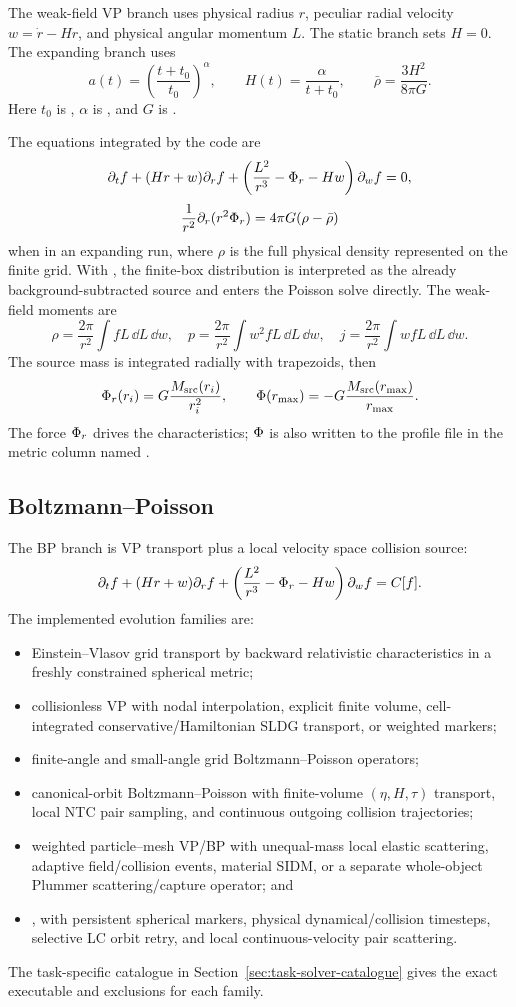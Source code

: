 The weak-field VP branch uses physical radius \(r\), peculiar radial velocity
\(w=\dot r-Hr\), and physical angular momentum \(L\).  The static branch sets
\(H=0\).  The expanding branch uses
\[
  a(t)=\left(\frac{t+t_0}{t_0}\right)^\alpha,\qquad
  H(t)=\frac{\alpha}{t+t_0},\qquad
  \bar\rho=\frac{3H^2}{8\pi G}.
\]
Here \(t_0\) is , \(\alpha\) is , and
\(G\) is .

The equations integrated by the code are
\[
  \partial_t f +(Hr+w)\partial_r f
  +\left(\frac{L^2}{r^3}-\Phi_r-Hw\right)\partial_w f=0,
\]
\[
  \frac{1}{r^2}\partial_r(r^2\Phi_r)
  =4\pi G(\rho-\bar\rho)
\]
when  in an expanding run, where
\(\rho\) is the full physical density represented on the finite grid.  With
, the finite-box distribution is interpreted as the
already background-subtracted source and enters the Poisson solve directly.
The weak-field moments are
\[
  \rho=\frac{2\pi}{r^2}\int fL\,\dd L\,\dd w,\quad
  p=\frac{2\pi}{r^2}\int w^2fL\,\dd L\,\dd w,\quad
  j=\frac{2\pi}{r^2}\int wfL\,\dd L\,\dd w .
\]
The source mass is integrated radially with trapezoids, then
\[
  \Phi_r(r_i)=G\frac{M_{\rm src}(r_i)}{r_i^2},
  \qquad
  \Phi(r_{\max})=-G\frac{M_{\rm src}(r_{\max})}{r_{\max}}.
\]
The force \(\Phi_r\) drives the characteristics; \(\Phi\) is also written to the
profile file in the metric column named .

\subsection{Boltzmann--Poisson}

The BP branch is VP transport plus a local velocity space collision source:
\[
  \partial_t f +(Hr+w)\partial_r f
  +\left(\frac{L^2}{r^3}-\Phi_r-Hw\right)\partial_w f=C[f].
\]
The implemented evolution families are:
\begin{itemize}
\item Einstein--Vlasov grid transport by backward relativistic
characteristics in a freshly constrained spherical metric;
\item collisionless VP with nodal interpolation, explicit finite volume,
cell-integrated conservative/Hamiltonian SLDG transport, or weighted markers;
\item finite-angle and small-angle grid Boltzmann--Poisson operators;
\item canonical-orbit Boltzmann--Poisson with finite-volume
\((\eta,H,\tau)\) transport, local NTC pair sampling, and continuous outgoing
collision trajectories;
\item weighted particle--mesh VP/BP with unequal-mass local elastic scattering,
adaptive field/collision events, material SIDM, or a separate whole-object
Plummer scattering/capture operator; and
\item {}, with persistent spherical markers, physical
dynamical/collision timesteps, selective LC orbit retry, and local
continuous-velocity pair scattering.
\end{itemize}
The task-specific catalogue in Section~\ref{sec:task-solver-catalogue} gives
the exact executable and exclusions for each family.
